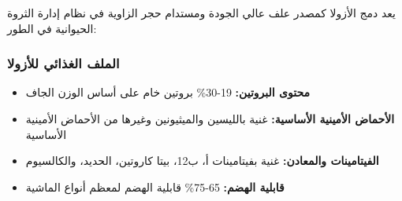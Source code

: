 يعد دمج الأزولا كمصدر علف عالي الجودة ومستدام حجر الزاوية في نظام إدارة الثروة الحيوانية في الطور:

\subsubsection{الملف الغذائي للأزولا}
\begin{itemize}
    \item \textbf{محتوى البروتين:} 19-30\% بروتين خام على أساس الوزن الجاف
    \item \textbf{الأحماض الأمينية الأساسية:} غنية بالليسين والميثيونين وغيرها من الأحماض الأمينية الأساسية
    \item \textbf{الفيتامينات والمعادن:} غنية بفيتامينات أ، ب12، بيتا كاروتين، الحديد، والكالسيوم
    \item \textbf{قابلية الهضم:} 65-75\% قابلية الهضم لمعظم أنواع الماشية
\end{itemize}

